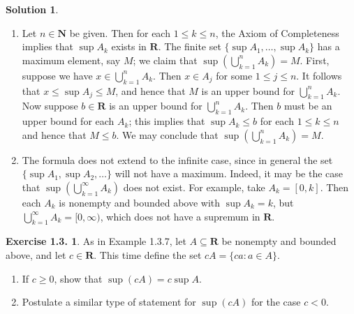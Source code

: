 \documentclass[12pt]{article}
\theoremstyle{definition}
\theoremstyle{exercise}
\newtheorem{exercise}{Exercise 1.3.}
\theoremstyle{solution}
\newtheorem*{solution}{Solution}
\newcommand{\N}{\mathbf{N}}
\newcommand{\R}{\mathbf{R}}
\begin{document}
\begin{solution}
    \begin{enumerate}
        \item Let \( n \in \N \) be given. Then for each \( 1 \leq k \leq n \), the Axiom of Completeness implies that \( \sup A_k \) exists in \( \R \). The finite set \( \{ \sup A_1, \ldots, \sup A_k \} \) has a maximum element, say \( M \); we claim that \( \sup \left( \bigcup_{k=1}^n A_k \right) = M \). First, suppose we have \( x \in \bigcup_{k=1}^n A_k \). Then \( x \in A_j \) for some \( 1 \leq j \leq n \). It follows that \( x \leq \sup A_j \leq M \), and hence that \( M \) is an upper bound for \( \bigcup_{k=1}^n A_k \). Now suppose \( b \in \R \) is an upper bound for \( \bigcup_{k=1}^n A_k \). Then \( b \) must be an upper bound for each \( A_k \); this implies that \( \sup A_k \leq b \) for each \( 1 \leq k \leq n \) and hence that \( M \leq b \). We may conclude that \( \sup \left( \bigcup_{k=1}^n A_k \right) = M \).

        \item The formula does not extend to the infinite case, since in general the set \( \{ \sup A_1, \sup A_2, \ldots \} \) will not have a maximum. Indeed, it may be the case that \( \sup \left( \bigcup_{k=1}^{\infty} A_k \right) \) does not exist. For example, take \( A_k = [0, k] \). Then each \( A_k \) is nonempty and bounded above with \( \sup A_k = k \), but \( \bigcup_{k=1}^{\infty} A_k = [0, \infty) \), which does not have a supremum in \( \R \).
    \end{enumerate}
\end{solution}

\begin{exercise}
\label{ex:5}
    As in Example 1.3.7, let \( A \subseteq \mathbf{R} \) be nonempty and bounded above, and let \( c \in \mathbf{R} \). This time define the set \( cA = \{ ca : a \in A \} \).
    \begin{enumerate}
        \item If \( c \geq 0 \), show that \( \sup (cA) = c \sup A \).

        \item Postulate a similar type of statement for \( \sup (cA) \) for the case \( c < 0 \).
    \end{enumerate}
\end{exercise}
\end{document}
